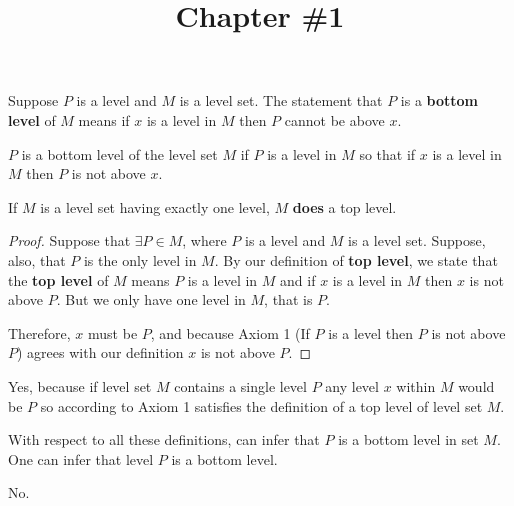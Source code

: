 \documentclass[12pt]{article}
\title{Chapter \#1}
\begin{document}
\maketitle

\problem
Suppose $P$ is a level and $M$ is a level set. The statement that $P$ is a \textbf{bottom level} of $M$ means if $x$ is a level in $M$ then $P$ cannot be above $x$.

\solutionAlt
$P$ is a bottom level of the level set $M$ if $P$ is a level in $M$ so that if $x$ is a level in $M$ then $P$ is not above $x$.


\problem
\begin{theorem}
    If $M$ is a level set having exactly one level, $M$ \textbf{does} a top level.
\end{theorem}

\begin{proof}
    Suppose that $\exists P \in M$, where $P$ is a level and $M$ is a level set. Suppose, also, that $P$ is the only level in $M$. By our definition of \textbf{top level}, we state that the \textbf{top level} of $M$ means $P$ is a level in $M$ and if $x$ is a level in $M$ then $x$ is not above $P$. But we only have one level in $M$, that is $P$.

    Therefore, $x$ must be $P$, and because Axiom 1 (If $P$ is a level then $P$ is not above $P$) agrees with our definition $x$ is not above $P$.
\end{proof}

\solutionAlt
Yes, because if level set $M$ contains a single level $P$ any level $x$ within $M$ would be $P$ so according to Axiom 1 satisfies the definition of a top level of level set $M$.


\problem
With respect to all these definitions, can infer that $P$ is a bottom level in set $M$. One can infer that level $P$ is a bottom level.


\problem
No.
\end{document}
